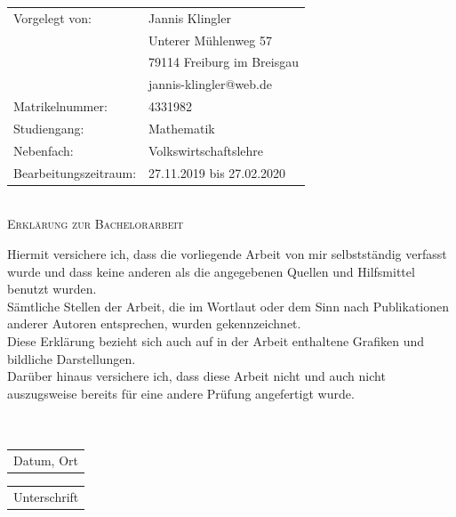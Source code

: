 \documentclass[11pt,titlepage]{article}
\theoremstyle{definition}
\theoremstyle{remark}
\begin{document}
	\thispagestyle{empty}
	\vspace*{17cm}
	\begin{tabular}{ll}
		Vorgelegt von: & Jannis Klingler \\
		& Unterer Mühlenweg 57\\
		& 79114 Freiburg im Breisgau
		\\
		& jannis-klingler@web.de\\
		Matrikelnummer: & {4331982} \\
		Studiengang: & {Mathematik}\\
		Nebenfach: & {Volkswirtschaftslehre}\\
		Bearbeitungszeitraum: & {27.11.2019 bis 27.02.2020} \\
	\end{tabular}\\
	
	\thispagestyle{empty}
		\vspace*{1cm}
		\LARGE\textsc{Erklärung zur Bachelorarbeit}
		
		\vspace{1.5cm}
		
		\normalsize 
		Hiermit versichere ich, dass die vorliegende Arbeit von mir selbstständig verfasst wurde und dass keine anderen als die angegebenen Quellen und Hilfsmittel benutzt wurden.\\ Sämtliche Stellen der Arbeit, die im Wortlaut oder dem Sinn nach Publikationen anderer Autoren entsprechen, wurden gekennzeichnet.\\
		Diese Erklärung bezieht sich auch auf in der Arbeit enthaltene Grafiken und bildliche Darstellungen.\\
		Darüber hinaus versichere ich, dass diese Arbeit nicht und auch nicht auszugsweise bereits für eine andere Prüfung angefertigt wurde. 
		\ \\
		\ \\
		\ \\
		\begin{minipage}{0.57\textwidth}
			\begin{tabular}{@{}l@{}}\hline
				Datum, Ort \hspace{4.2cm}
			\end{tabular}
		\end{minipage}
		\hfill
		\begin{minipage}{0.43\textwidth} 
			\begin{tabular}{@{}l@{}}\hline
				Unterschrift \hspace{4.2cm}
			\end{tabular}
		\end{minipage}
		
\end{document}
